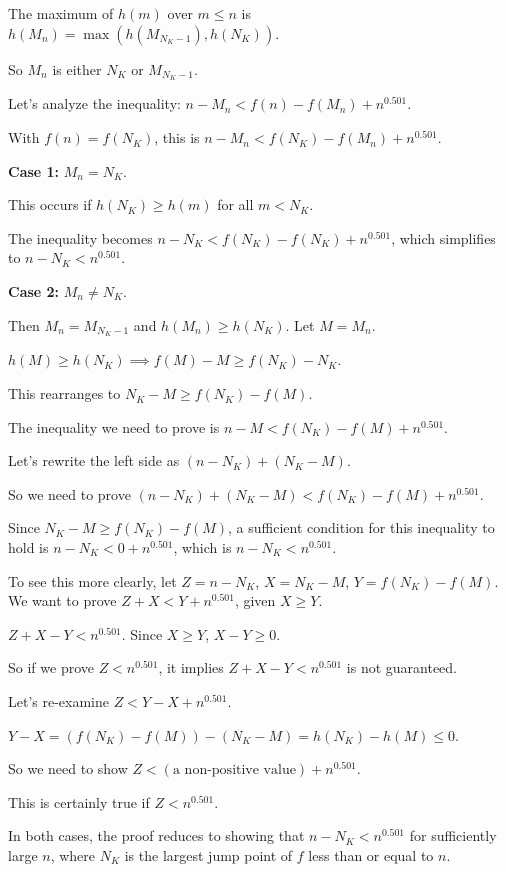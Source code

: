 \documentclass[12pt,a4paper]{article}
\theoremstyle{definition}
\begin{document}
    The maximum of $h(m)$ over $m \le n$ is $h(M_n) = \max(h(M_{N_K-1}), h(N_K))$.

    So $M_n$ is either $N_K$ or $M_{N_K-1}$.

    Let's analyze the inequality: $n-M_n < f(n)-f(M_n) + n^{0.501}$.

    With $f(n)=f(N_K)$, this is $n-M_n < f(N_K)-f(M_n) + n^{0.501}$.

    \textbf{Case 1:} $M_n = N_K$.

    This occurs if $h(N_K) \ge h(m)$ for all $m < N_K$.

    The inequality becomes $n-N_K < f(N_K)-f(N_K) + n^{0.501}$, which simplifies to $n-N_K < n^{0.501}$.

    \textbf{Case 2:} $M_n \ne N_K$.

    Then $M_n = M_{N_K-1}$ and $h(M_n) \ge h(N_K)$. Let $M=M_n$.

    $h(M) \ge h(N_K) \implies f(M)-M \ge f(N_K)-N_K$.

    This rearranges to $N_K-M \ge f(N_K)-f(M)$.

    The inequality we need to prove is $n-M < f(N_K)-f(M) + n^{0.501}$.

    Let's rewrite the left side as $(n-N_K) + (N_K-M)$.

    So we need to prove $(n-N_K) + (N_K-M) < f(N_K)-f(M) + n^{0.501}$.

    Since $N_K-M \ge f(N_K)-f(M)$, a sufficient condition for this inequality to hold is $n-N_K < 0 + n^{0.501}$, which is $n-N_K < n^{0.501}$.

    To see this more clearly, let $Z=n-N_K$, $X=N_K-M$, $Y=f(N_K)-f(M)$. We want to prove $Z+X < Y+n^{0.501}$, given $X \ge Y$.

    $Z+X-Y < n^{0.501}$. Since $X \ge Y$, $X-Y \ge 0$.

    So if we prove $Z < n^{0.501}$, it implies $Z+X-Y < n^{0.501}$ is not guaranteed.

    Let's re-examine $Z < Y-X+n^{0.501}$.

    $Y-X = (f(N_K)-f(M))-(N_K-M) = h(N_K)-h(M) \le 0$.

    So we need to show $Z < (\text{a non-positive value}) + n^{0.501}$.

    This is certainly true if $Z < n^{0.501}$.

    In both cases, the proof reduces to showing that $n-N_K < n^{0.501}$ for sufficiently large $n$, where $N_K$ is the largest jump point of $f$ less than or equal to $n$.
\end{document}

